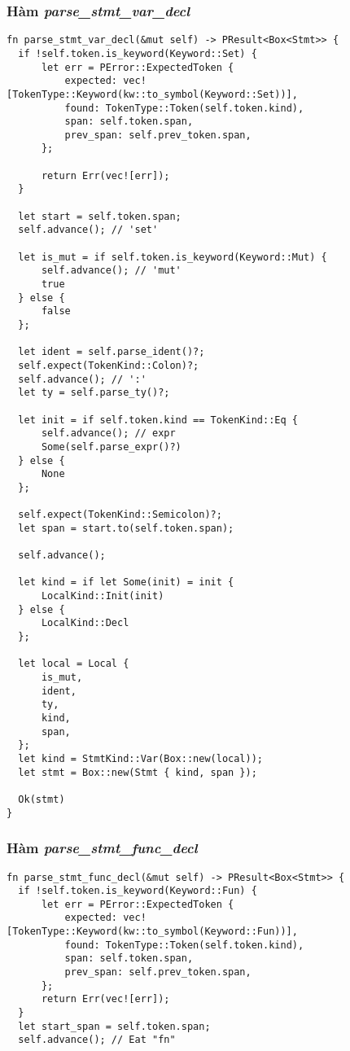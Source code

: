 {\subsubsection{Hàm \textit{parse\_stmt\_var\_decl}}
\label{ap1:stmt_decl_var}
\begin{lstlisting}
fn parse_stmt_var_decl(&mut self) -> PResult<Box<Stmt>> {
  if !self.token.is_keyword(Keyword::Set) {
      let err = PError::ExpectedToken {
          expected: vec![TokenType::Keyword(kw::to_symbol(Keyword::Set))],
          found: TokenType::Token(self.token.kind),
          span: self.token.span,
          prev_span: self.prev_token.span,
      };

      return Err(vec![err]);
  }

  let start = self.token.span;
  self.advance(); // 'set'

  let is_mut = if self.token.is_keyword(Keyword::Mut) {
      self.advance(); // 'mut'
      true
  } else {
      false
  };

  let ident = self.parse_ident()?;
  self.expect(TokenKind::Colon)?;
  self.advance(); // ':'
  let ty = self.parse_ty()?;

  let init = if self.token.kind == TokenKind::Eq {
      self.advance(); // expr
      Some(self.parse_expr()?)
  } else {
      None
  };

  self.expect(TokenKind::Semicolon)?;
  let span = start.to(self.token.span);

  self.advance();

  let kind = if let Some(init) = init {
      LocalKind::Init(init)
  } else {
      LocalKind::Decl
  };

  let local = Local {
      is_mut,
      ident,
      ty,
      kind,
      span,
  };
  let kind = StmtKind::Var(Box::new(local));
  let stmt = Box::new(Stmt { kind, span });

  Ok(stmt)
}
\end{lstlisting}

\subsubsection{Hàm \textit{parse\_stmt\_func\_decl}}
\label{ap1:stmt_decl_fun}
\begin{lstlisting}
fn parse_stmt_func_decl(&mut self) -> PResult<Box<Stmt>> {
  if !self.token.is_keyword(Keyword::Fun) {
      let err = PError::ExpectedToken {
          expected: vec![TokenType::Keyword(kw::to_symbol(Keyword::Fun))],
          found: TokenType::Token(self.token.kind),
          span: self.token.span,
          prev_span: self.prev_token.span,
      };
      return Err(vec![err]);
  }
  let start_span = self.token.span;
  self.advance(); // Eat "fn"


\end{lstlisting}}
